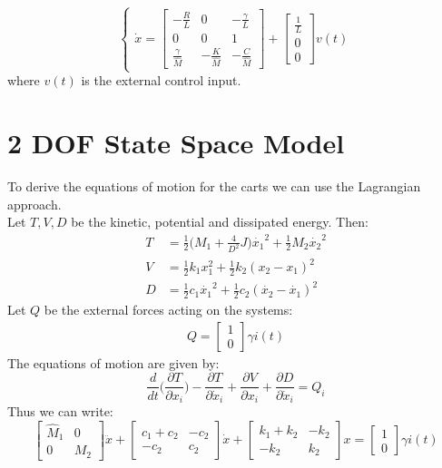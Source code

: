 \begin{equation}
\begin{cases}
\dot{x}=\begin{bmatrix}
-\frac{R}{L} &0 & -\frac{\gamma}{L} \\
0 & 0 & 1 \\ 
 \frac{\gamma}{\hat{M}} & -\frac{K}{\hat{M}} & -\frac{C}{\hat{M}}
\end{bmatrix}
+
\begin{bmatrix}\frac{1}{L} \\ 0 \\ 0\end{bmatrix} v(t)
\end{cases}
\end{equation}
where $v(t)$ is the external control input.
\section{2 DOF State Space Model}
To derive the equations of motion for the carts we can use the Lagrangian approach.\\ Let $T,V,D$ be the kinetic, potential and dissipated energy. Then:
\begin{align}
T  &= \frac{1}{2} \Big(M_1 + \frac{4}{D^2}J \Big) \dot{x_1}^2 + \frac{1}{2}M_2 \dot{x_2}^2 \\
V &= \frac{1}{2}k_1x_1^2 + \frac{1}{2}k_2(x_2-x_1)^2 \\
D &= \frac{1}{2}c_1\dot{x_1}^2 + \frac{1}{2}c_2(\dot{x_2}-\dot{x_1})^2
\end{align}
Let $Q$ be the external forces acting on the systems:
\begin{align}
Q =\begin{bmatrix} 1 \\ 0 \end{bmatrix} \gamma i(t)
\end{align}
The equations of motion are given by:
\begin{equation}
\frac{d}{dt}\Big(\frac{\partial T}{\partial x_i} \Big) -\frac{\partial T}{\partial \dot{x}_i} + \frac{\partial V}{\partial x_i} + \frac{\partial D}{\partial \dot{x}_i} = Q_i\end{equation}
Thus we can write:
\begin{equation}
\begin{bmatrix}
\hat{M}_1 & 0 \\
0 & M_2
\end{bmatrix}
\ddot{x} + 
\begin{bmatrix}
c_1+c_2 & -c_2 \\
-c_2 & c_2
\end{bmatrix}
\dot{x}+
\begin{bmatrix}
k_1+k_2 & -k_2 \\
-k_2 & k_2
\end{bmatrix}
x = \begin{bmatrix} 1 \\ 0 \end{bmatrix}\gamma i(t)\end{equation}
